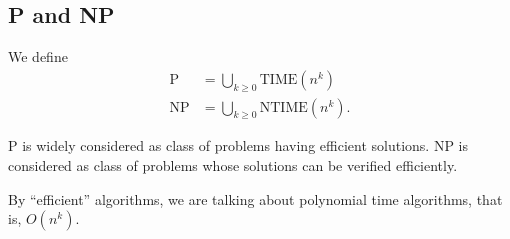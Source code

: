 \documentclass{article}
\begin{document}
\subsection{P and NP}

We define 
\begin{align*}
  \text{P} &= \bigcup_{k\geq 0} \text{TIME}(n^k) \\
  \text{NP} &= \bigcup_{k\geq 0} \text{NTIME}(n^k).
\end{align*}

P is widely considered as class of problems having efficient solutions. NP is considered as class of problems whose solutions can be verified efficiently.

By ``efficient'' algorithms, we are talking about polynomial time algorithms, that is, $O(n^k)$.
\end{document}
